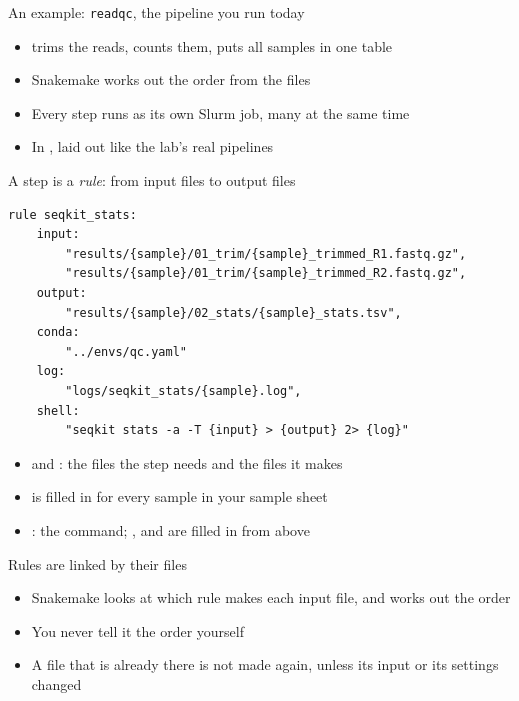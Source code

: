\begin{frame}{An example: \texttt{readqc}, the pipeline you run today}

\bigskip
\begin{itemize}
    \item {} trims the reads,  counts them,
           puts all samples in one table
    \item Snakemake works out the order from the files
    \item Every step runs as its own Slurm job, many at the same time
    \item In , laid out like the lab's real pipelines
\end{itemize}
\end{frame}

\begin{frame}[fragile]{A step is a \emph{rule}: from input files to output files}
\begin{lstlisting}[style=scriptsize]
rule seqkit_stats:
    input:
        "results/{sample}/01_trim/{sample}_trimmed_R1.fastq.gz",
        "results/{sample}/01_trim/{sample}_trimmed_R2.fastq.gz",
    output:
        "results/{sample}/02_stats/{sample}_stats.tsv",
    conda:
        "../envs/qc.yaml"
    log:
        "logs/seqkit_stats/{sample}.log",
    shell:
        "seqkit stats -a -T {input} > {output} 2> {log}"
\end{lstlisting}

\medskip
\footnotesize
\begin{itemize}
    \item {} and : the files the step needs and the files it makes
    \item {} is filled in for every sample in your sample sheet
    \item {}: the command; ,  and 
          are filled in from above
\end{itemize}
\end{frame}

\begin{frame}{Rules are linked by their files}

\bigskip
\begin{itemize}
    \item Snakemake looks at which rule makes each input file, and works out the order
    \item You never tell it the order yourself
    \item A file that is already there is not made again,
          unless its input or its settings changed
\end{itemize}
\end{frame}


